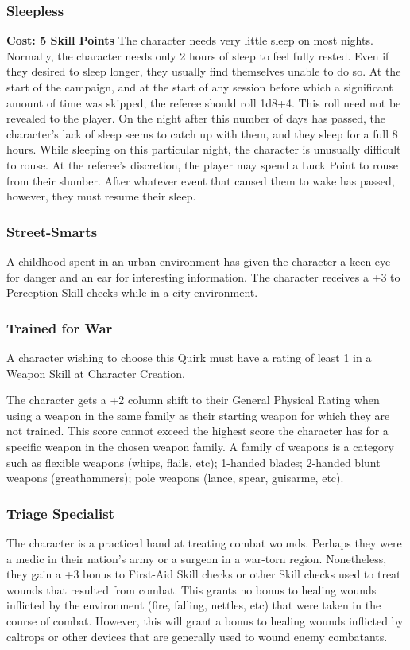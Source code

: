 \documentclass[oneside]{book}
\begin{document}
\begin{multicols}{2}
\subsubsection{Sleepless}
\textbf{\small Cost: 5 Skill Points}
The character needs very little sleep on most nights. Normally, the character needs only 2 hours of sleep to feel fully rested. Even if they desired to sleep longer, they usually find themselves unable to do so. At the start of the campaign, and at the start of any session before which a significant amount of time was skipped, the referee should roll 1d8+4. This roll need not be revealed to the player. On the night after this number of days has passed, the character's lack of sleep seems to catch up with them, and they sleep for a full 8 hours. While sleeping on this particular night, the character is unusually difficult to rouse. At the referee's discretion, the player may spend a Luck Point to rouse from their slumber. After whatever event that caused them to wake has passed, however, they must resume their sleep.

\subsubsection{Street-Smarts}
A childhood spent in an urban environment has given the character a keen eye for danger and an ear for interesting information. The character receives a +3 to Perception Skill checks while in a city environment. 

\subsubsection{Trained for War}
A character wishing to choose this Quirk must have a rating of least 1 in a Weapon Skill at Character Creation.

The character gets a +2 column shift to their General Physical Rating when using a weapon in the same family as their starting weapon for which they are not trained. This score cannot exceed the highest score the character has for a specific weapon in the chosen weapon family. A family of weapons is a category such as flexible weapons (whips, flails, etc); 1-handed blades; 2-handed blunt weapons (greathammers); pole weapons (lance, spear, guisarme, etc).

\subsubsection{Triage Specialist}
The character is a practiced hand at treating combat wounds. Perhaps they were a medic in their nation's army or a surgeon in a war-torn region. Nonetheless, they gain a +3 bonus to First-Aid Skill checks or other Skill checks used to treat wounds that resulted from combat. This grants no bonus to healing wounds inflicted by the environment (fire, falling, nettles, etc) that were taken in the course of combat. However, this will grant a bonus to healing wounds inflicted by caltrops or other devices that are generally used to wound enemy combatants.


\end{multicols}
\end{document}
